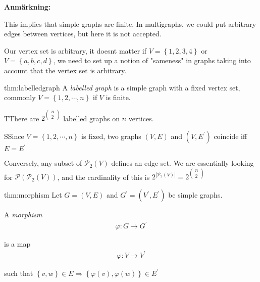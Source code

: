 \par\bigskip
\noindent\textbf{Anmärkning:}\par
\noindent This implies that simple graphs are finite. In multigraphs, we could put arbitrary edges between vertices, but here it is not accepted. 
\par\bigskip
\noindent Our vertex set is arbitrary, it doesnt matter if $V=\left\{1,2,3,4\right\}$ or $V = \left\{a,b,c,d\right\}$, we need to set up a notion of "sameness" in graphs taking into account that the vertex set is arbitrary.
\par\bigskip
\begin{theo}{thm:labelledgraph}
A \textit{labelled graph} is a simple graph with a fixed vertex set, commonly $V = \left\{1,2,\cdots,n\right\}$ if $V$ is finite.
\end{theo}
\newpage
\begin{lem}
  TThere are $2^{\begin{pmatrix}n\\2\end{pmatrix}}$ labelled graphs on $n$ vertices.
\end{lem}
\par\bigskip
\begin{prf}
  SSince $V = \left\{1,2,\cdots,n\right\}$ is fixed, two graphs $(V,E)$ and $(V,E^{\prime})$ coincide iff $E=E^{\prime}$
  \par\bigskip
  \noindent Conversely, any subset of $\mathcal{P}_2(V)$ defines an edge set. We are essentially looking for $\mathcal{P}(\mathcal{P}_2(V))$, and the cardinality of this is $2^{\left|\mathcal{P}_2(V)\right|} = 2^{\begin{pmatrix}n\\2\end{pmatrix}}$
\end{prf}
\par\bigskip
\begin{theo}[Morphism]{thm:morphism}
  Let $G = (V,E)$ and $G^{\prime} = (V^{\prime}, E^{\prime})$ be simple graphs.
  \par\bigskip
  \noindent A \textit{morphism}
  \begin{equation*}
    \begin{gathered}
      \varphi:G\to G^{\prime}
    \end{gathered}
  \end{equation*}\par
  \noindent is a map
  \begin{equation*}
    \begin{gathered}
      \varphi:V\to V^{\prime}
    \end{gathered}
  \end{equation*}\par
\noindent such that $\left\{v,w\right\}\in E\Rightarrow \left\{\varphi(v),\varphi(w)\right\}\in E^{\prime}$
\end{theo}
